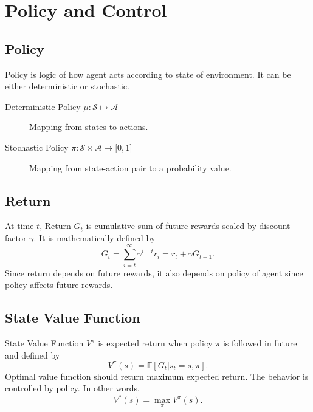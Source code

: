 \section{Policy and Control}
\label{sec:policy_control}

\subsection{Policy}

Policy is logic of how agent acts according to state of environment. 
It can be either deterministic or stochastic. 

\begin{description}
	\item[Deterministic Policy $\mu \colon \mathcal{S} \mapsto \mathcal{A}$] 
	Mapping from states to actions.
	\item[Stochastic Policy $\pi \colon \mathcal{S} \times \mathcal{A} \mapsto \lbrack 0,1 \rbrack$] 
	Mapping from state-action pair to a probability value.
\end{description}

\subsection{Return}

At time $t$, Return $G_t$ is cumulative sum of future rewards scaled by discount factor $\gamma$. 
It is mathematically defined by 
\begin{equation}
G_t = \sum_{i=t}^{\infty} \gamma^{i-t} r_i = r_t + \gamma G_{t+1}.
\end{equation}
Since return depends on future rewards, it also depends on policy of agent since policy affects future rewards.

\subsection{State Value Function}

State Value Function $V^{\pi}$ is expected return when policy $\pi$ is followed in future and defined by
\begin{equation}
V^{\pi}(s) = \mathbb{E}[G_t|s_t=s, \pi]. %
\end{equation}
Optimal value function should return maximum expected return. 
The behavior is controlled by policy. In other words, 
\begin{equation}
V^{*}(s) = \max_{\pi} V^{\pi}(s).
\end{equation}

